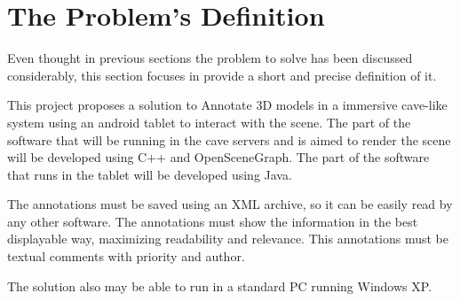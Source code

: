 \section{The Problem's Definition}

Even thought in previous sections the problem to solve has been discussed considerably, this section focuses in provide a short and precise definition of it.

This project proposes a solution to Annotate 3D models in a immersive cave-like system using an android tablet to interact with the scene. The part of the software that will be running in the cave servers and is aimed to render the scene will be developed using C++ and OpenSceneGraph. The part of the software that runs in the tablet will be developed using Java.

The annotations must be saved using an XML archive, so it can be easily read by any other software. The annotations must show the information in the best displayable way, maximizing readability and relevance. This annotations must be textual comments with priority and author.

The solution also may be able to run in a standard PC running Windows XP. 
